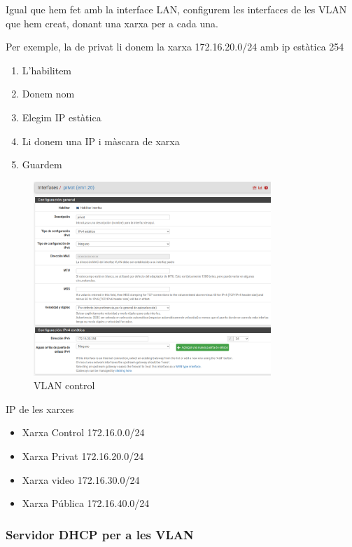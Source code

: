 \documentclass[
  10pt,
]{krantz}
\providecommand{\tightlist}{%
  \setlength{\itemsep}{0pt}\setlength{\parskip}{0pt}}
\begin{document}
Igual que hem fet amb la interface LAN, configurem les interfaces de les VLAN que hem creat, donant una xarxa per a cada una.

Per exemple, la de privat li donem la xarxa 172.16.20.0/24 amb ip estàtica 254

\begin{enumerate}
\def\labelenumi{\arabic{enumi}.}
\tightlist
\item
  L'habilitem
\item
  Donem nom
\item
  Elegim IP estàtica
\item
  Li donem una IP i màscara de xarxa
\item
  Guardem
\end{enumerate}

\begin{figure}
\centering
\includegraphics[width=0.8\textwidth,height=\textheight]{imatges/proxmox/conf_vlan20.png}
\caption{VLAN control}
\end{figure}

IP de les xarxes

\begin{itemize}
\tightlist
\item
  Xarxa Control 172.16.0.0/24
\item
  Xarxa Privat 172.16.20.0/24
\item
  Xarxa video 172.16.30.0/24
\item
  Xarxa Pública 172.16.40.0/24
\end{itemize}

\hypertarget{servidor-dhcp-per-a-les-vlan}{%
\subsubsection{Servidor DHCP per a les VLAN}\label{servidor-dhcp-per-a-les-vlan}}
\end{document}
